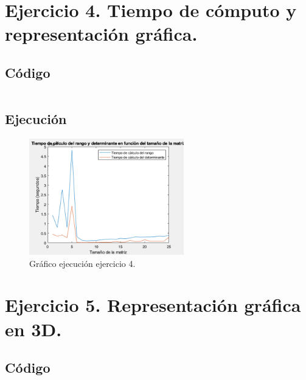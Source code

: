 \documentclass[a4paper, 12pt]{article}
\begin{document}
	\section{Ejercicio 4. Tiempo de cómputo y representación gráfica.}
	
	\subsection{Código}
	\inputminted[fontsize=\scriptsize, linenos, breaklines=true, xleftmargin=0.75cm, frame=lines]{matlab}{code/Ejercicio4.m}
	\subsection{Ejecución}
	\begin{figure}[htp!]
		\centering
		\includegraphics[width=0.6\textwidth]{figures/graf4.png}
		\caption{Gráfico ejecución ejercicio 4.}
	\end{figure}
	
	\section{Ejercicio 5. Representación gráfica en 3D.}
	
	\subsection{Código}
	\inputminted[fontsize=\scriptsize, linenos, breaklines=true, xleftmargin=0.75cm, frame=lines]{matlab}{code/Ejercicio5.m}
\end{document}
